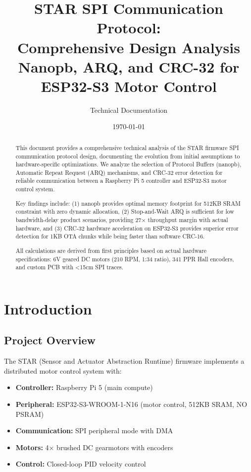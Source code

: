\documentclass[12pt,letterpaper]{article}
\title{\textbf{STAR SPI Communication Protocol:\\Comprehensive Design Analysis}\\\large{Nanopb, ARQ, and CRC-32 for ESP32-S3 Motor Control}}
\author{Technical Documentation}
\date{\today}
\begin{document}
\maketitle

\begin{abstract}
This document provides a comprehensive technical analysis of the STAR firmware SPI communication protocol design, documenting the evolution from initial assumptions to hardware-specific optimizations. We analyze the selection of Protocol Buffers (nanopb), Automatic Repeat Request (ARQ) mechanisms, and CRC-32 error detection for reliable communication between a Raspberry Pi 5 controller and ESP32-S3 motor control system.

Key findings include: (1) nanopb provides optimal memory footprint for 512KB SRAM constraint with zero dynamic allocation, (2) Stop-and-Wait ARQ is sufficient for low bandwidth-delay product scenarios, providing 27× throughput margin with actual hardware, and (3) CRC-32 hardware acceleration on ESP32-S3 provides superior error detection for 1KB OTA chunks while being faster than software CRC-16.

All calculations are derived from first principles based on actual hardware specifications: 6V geared DC motors (210 RPM, 1:34 ratio), 341 PPR Hall encoders, and custom PCB with <15cm SPI traces.
\end{abstract}

\tableofcontents
\newpage

\section{Introduction}

\subsection{Project Overview}

The STAR (Sensor and Actuator Abstraction Runtime) firmware implements a distributed motor control system with:
\begin{itemize}
    \item \textbf{Controller:} Raspberry Pi 5 (main compute)
    \item \textbf{Peripheral:} ESP32-S3-WROOM-1-N16 (motor control, 512KB SRAM, NO PSRAM)
    \item \textbf{Communication:} SPI peripheral mode with DMA
    \item \textbf{Motors:} 4× brushed DC gearmotors with encoders
    \item \textbf{Control:} Closed-loop PID velocity control
\end{itemize}
\end{document}
